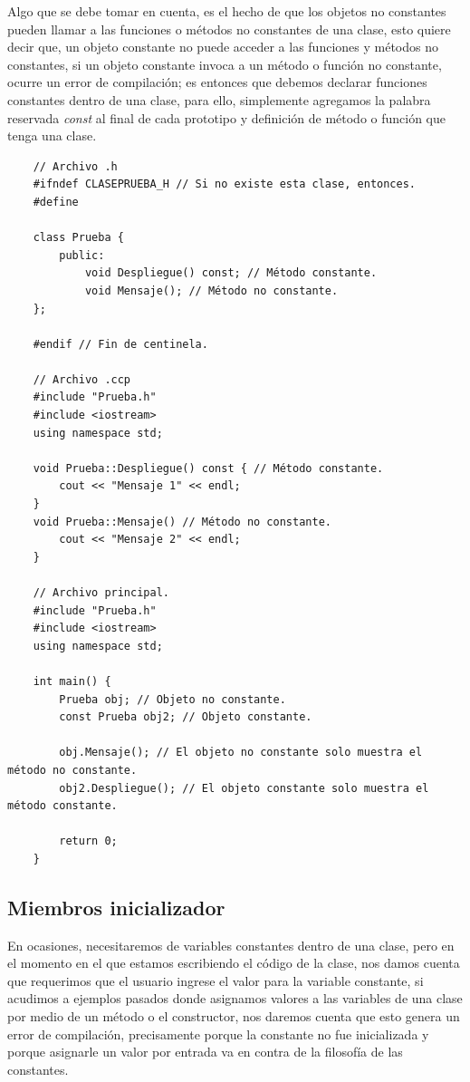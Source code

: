 Algo que se debe tomar en cuenta, es el hecho de que los objetos no constantes pueden llamar a las funciones o métodos no constantes de una clase, esto quiere decir que, un objeto constante no puede acceder a las funciones y métodos no constantes, si un objeto constante invoca a un método o función no constante, ocurre un error de compilación; es entonces que debemos declarar funciones constantes dentro de una clase, para ello, simplemente agregamos la palabra reservada \textit{const} al final de cada prototipo y definición de método o función que tenga una clase.
\begin{lstlisting}
    // Archivo .h
    #ifndef CLASEPRUEBA_H // Si no existe esta clase, entonces.
    #define
    
    class Prueba {
        public:
            void Despliegue() const; // Método constante.
            void Mensaje(); // Método no constante.
    };
    
    #endif // Fin de centinela.
    
    // Archivo .ccp
    #include "Prueba.h"
    #include <iostream>
    using namespace std;
    
    void Prueba::Despliegue() const { // Método constante.
        cout << "Mensaje 1" << endl;
    }
    void Prueba::Mensaje() // Método no constante.
        cout << "Mensaje 2" << endl;
    }
    
    // Archivo principal.
    #include "Prueba.h"
    #include <iostream>
    using namespace std;
    
    int main() {
        Prueba obj; // Objeto no constante.
        const Prueba obj2; // Objeto constante.
        
        obj.Mensaje(); // El objeto no constante solo muestra el método no constante.
        obj2.Despliegue(); // El objeto constante solo muestra el método constante.
        
        return 0;
    }
\end{lstlisting}


\subsection{Miembros inicializador}
\hspace{0.55cm}En ocasiones, necesitaremos de variables constantes dentro de una clase, pero en el momento en el que estamos escribiendo el código de la clase, nos damos cuenta que requerimos que el usuario ingrese el valor para la variable constante, si acudimos a ejemplos pasados donde asignamos valores a las variables de una clase por medio de un método o el constructor, nos daremos cuenta que esto genera un error de compilación, precisamente porque la constante no fue inicializada y porque asignarle un valor por entrada va en contra de la filosofía de las constantes.

